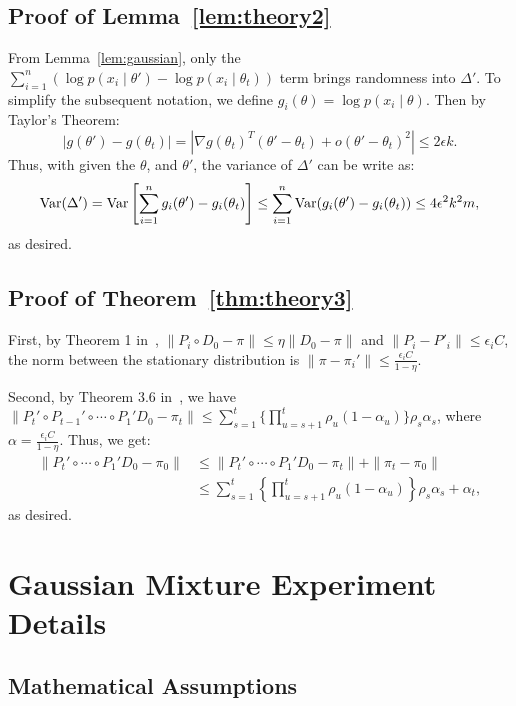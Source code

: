 \documentclass{article}
\begin{document}
\subsection{Proof of Lemma~\ref{lem:theory2}}\label{app:theory2}

From Lemma~\ref{lem:gaussian}, only the $\sum_{i=1}^n (\log p(x_i\mid \theta') - \log p(x_i\mid
\theta_t))$ term brings randomness into $\Delta'$. To simplify the subsequent notation, we define
$g_i(\theta) = \log p(x_i\mid \theta)$. Then by Taylor's Theorem:
\[
|g(\theta') - g(\theta_t)| = |\nabla g(\theta_t)^T(\theta' - \theta_t) + o(\theta' - \theta_t)^2| \leq 2\epsilon k.
\]
Thus, with given the $\theta$, and $\theta'$, the variance of $\Delta'$ can be write as:
\[
{\rm Var}(\Delta') = {\rm Var}\left[\sum_{i=1}^n g_i(\theta') - g_i(\theta_t)\right] \leq
\sum_{i=1}^n  {\rm Var}(g_i(\theta') - g_i(\theta_t)) \leq  4\epsilon^2 k^2m,
\]
as desired.

\subsection{Proof of Theorem~\ref{thm:theory3}}\label{app:theory3}

First, by Theorem 1 in~\cite{cutting_mh_2014}, $\|P_i \circ D_0 - \pi\| \leq \eta \|D_0
- \pi\|$ and $\|P_i-P'_i\| \leq \epsilon_i C$, the norm between the stationary distribution is $\|\pi
- \pi_i'\|\leq \frac{\epsilon_i C}{1-\eta}$.

Second, by Theorem 3.6 in~\cite{yang2013sequential}, we have  $\| P_t' \circ P_{t-1}' \circ \cdots
\circ P_1' D_0 - \pi_t \| \leq \sum_{s=1}^t \{\prod _{u=s+1}^t \rho_u (1-\alpha_u)\} \rho_s
\alpha_s$, where $\alpha = \frac{\epsilon_i C}{1-\eta}$. Thus, we get:
\begin{align*}
 \| P_t' \circ \cdots \circ P_1' D_0 - \pi_0 \| &\leq \|P_t' \circ \cdots \circ P_1' D_0 - \pi_t\| + \|\pi_t - \pi_0\| \\
 &\leq \sum_{s=1}^t \left\{\prod _{u=s+1}^t \rho_u (1-\alpha_u)\right\} \rho_s \alpha_s + \alpha_t,
\end{align*}
as desired.




\section{Gaussian Mixture Experiment Details}\label{app:gaussian}

\subsection{Mathematical Assumptions}
\end{document}
